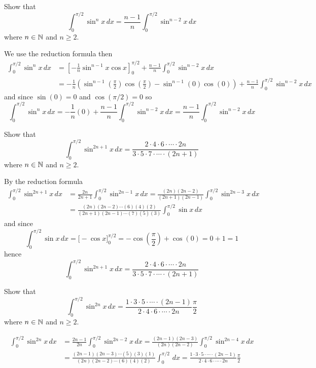 \begin{problem}
    Show that
    \[\int_0^{\pi/2}\sin^n x\,dx=\frac{n-1}{n}\int_0^{\pi/2}\sin^{n-2}x\,dx\]
    where \(n\in\mathbb{N}\) and \(n\geq 2\).
\end{problem}
\begin{solution}
    We use the reduction formula then
    \begin{align*}
        \int_0^{\pi/2}\sin^n x\,dx
        &= \left[-\frac{1}{n}\sin^{n-1} x\cos x\right]_0^{\pi/2}
        +\frac{n-1}{n}\int_0^{\pi/2}\sin^{n-2} x\,dx \\
        &= -\frac{1}{n}\left(\sin^{n-1}\left(\frac{\pi}{2}\right)
        \cos\left(\frac{\pi}{2}\right)-\sin^{n-1}(0)\cos(0)\right)
        +\frac{n-1}{n}\int_0^{\pi/2}\sin^{n-2} x\,dx
    \end{align*}
    and since \(\sin(0)=0\) and \(\cos(\pi/2)=0\) so
    \[\int_0^{\pi/2}\sin^n x\,dx=-\frac{1}{n}(0)
    +\frac{n-1}{n}\int_0^{\pi/2}\sin^{n-2} x\,dx
    =\frac{n-1}{n}\int_0^{\pi/2}\sin^{n-2} x\,dx\]
\end{solution}
\begin{problem}
    Show that
    \[\int_0^{\pi/2}\sin^{2n+1} x\,dx
    =\frac{2\cdot4\cdot6\cdot\cdots\cdot2n}
    {3\cdot5\cdot7\cdot\cdots\cdot(2n+1)}\]
    where \(n\in\mathbb{N}\) and \(n\geq 2\).
\end{problem}
\begin{solution}
    By the reduction formula
    \begin{align*}
        \int_0^{\pi/2}\sin^{2n+1} x\,dx
        &= \frac{2n}{2n+1}\int_{0}^{\pi/2}\sin^{2n-1} x\,dx
        =\frac{(2n)(2n-2)}{(2n+1)(2n-1)}\int_{0}^{\pi/2}\sin^{2n-3} x\,dx \\
        &= \frac{(2n)(2n-2)\cdots(6)(4)(2)}{(2n+1)(2n-1)\cdots(7)(5)(3)}
        \int_{0}^{\pi/2}\sin x\,dx
    \end{align*}
    and since
    \[\int_{0}^{\pi/2}\sin x\,dx=\Big[-\cos x\Big]_0^{\pi/2}
    =-\cos\left(\frac{\pi}{2}\right)+\cos(0)=0+1=1\]
    hence
    \[\int_0^{\pi/2}\sin^{2n+1} x\,dx
    =\frac{2\cdot4\cdot6\cdot\cdots\cdot2n}
    {3\cdot5\cdot7\cdot\cdots\cdot(2n+1)}\]
\end{solution}
\begin{problem}
    Show that
    \[\int_0^{\pi/2}\sin^{2n} x\,dx
    =\frac{1\cdot3\cdot5\cdot\cdots\cdot(2n-1)}
    {2\cdot4\cdot6\cdot\cdots\cdot2n}\frac{\pi}{2}\]
    where \(n\in\mathbb{N}\) and \(n\geq 2\).
\end{problem}
\begin{solution}
    \begin{align*}
        \int_0^{\pi/2}\sin^{2n} x\,dx
        &= \frac{2n-1}{2n}\int_0^{\pi/2}\sin^{2n-2} x\,dx
        =\frac{(2n-1)(2n-3)}{(2n)(2n-2)}\int_0^{\pi/2}\sin^{2n-4} x\,dx \\
        &= \frac{(2n-1)(2n-3)\cdots(5)(3)(1)}{(2n)(2n-2)\cdots(6)(4)(2)}
        \int_0^{\pi/2}\,dx=\frac{1\cdot3\cdot5\cdot\cdots\cdot(2n-1)}
        {2\cdot4\cdot6\cdot\cdots\cdot2n}\frac{\pi}{2} 
    \end{align*}
\end{solution}
